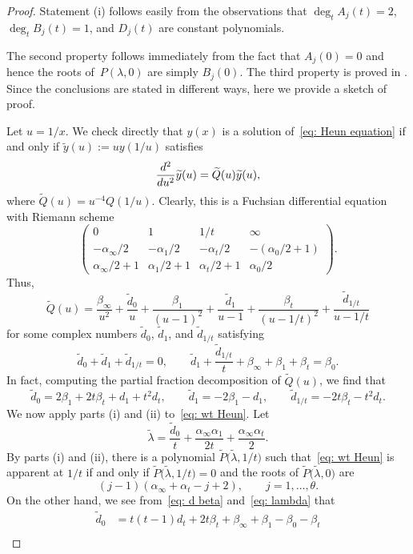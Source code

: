 \documentclass[11pt]{article}
\numberwithin{equation}{section}
\numberwithin{equation}{section}
\def\wt#1{\widetilde{#1}}
\begin{document}
\begin{proof}
Statement (i) follows easily from the observations that
 $\deg_t A_j(t)=2$, ${\deg_tB_j(t)=1}$, and $D_j(t)$ are
 constant polynomials.

 The second property follows immediately from the fact that
 $A_j(0)=0$ and hence the roots of~$P(\lambda,0)$ are simply
 $B_j(0)$. The third property is proved in \cite[Theorem~B.3]{Chen-Lin-Yang}. Since the conclusions are stated in different
 ways, here we provide a sketch of proof.

 Let $u=1/x$. We check directly that $y(x)$ is a solution of~\eqref{eq: Heun equation} if and only if $\wt y(u):=uy(1/u)$
 satisfies
 \begin{equation} \label{eq: wt Heun}
 \frac{{\rm d}^2}{{\rm d}u^2}\wt y(u)=\wt Q(u)\wt y(u),
 \end{equation}
 where $\wt Q(u)=u^{-4}Q(1/u)$. Clearly, this is a Fuchsian
 differential equation with Riemann scheme
\[
 \begin{pmatrix}
 0 & 1 & 1/t & \infty \\
 -\alpha_\infty/2 & -\alpha_1/2 & -\alpha_t/2 &
 -(\alpha_0/2+1) \\
 \alpha_\infty/2+1 & \alpha_1/2+1 & \alpha_t/2+1
 & \alpha_0/2 \end{pmatrix}.
\]
 Thus,
\[
 \wt Q(u)=\frac{\beta_\infty}{u^2}+\frac{\wt d_0}u
 +\frac{\beta_1}{(u-1)^2}+\frac{\wt d_1}{u-1}
 +\frac{\beta_t}{(u-1/t)^2}+\frac{\wt d_{1/t}}{u-1/t}
\]
 for some complex numbers $\wt d_0$, $\wt d_1$, and $\wt d_{1/t}$
 satisfying
\[
 \wt d_0+\wt d_1+\wt d_{1/t}=0, \qquad
 \wt d_1+\frac{\wt d_{1/t}}t+\beta_\infty+\beta_1+\beta_t=\beta_0.
\]
In fact, computing the partial fraction decomposition of $\wt Q(u)$,
 we find that
\[
 \wt d_0=2\beta_1+2t\beta_t+d_1+t^2d_t, \qquad
 \wt d_1=-2\beta_1-d_1, \qquad
 \wt d_{1/t}=-2t\beta_t-t^2d_t.
\]
 We now apply parts (i) and (ii) to~\eqref{eq: wt Heun}. Let
\[
 \wt\lambda=\frac{\wt d_0}t+\frac{\alpha_\infty\alpha_1}{2t}
 +\frac{\alpha_\infty\alpha_t}2.
\]
 By parts (i) and (ii), there is a polynomial $\wt P\bigl(\wt\lambda,1/t\bigr)$
 such that~\eqref{eq: wt Heun} is apparent at $1/t$ if and only if
 $\wt P\bigl(\wt\lambda,1/t\bigr)=0$ and the roots of $\wt P\bigl(\wt\lambda,0\bigr)$
 are
\[
 (j-1)(\alpha_\infty+\alpha_t-j+2), \qquad
 j=1,\dots,\theta.
\]
 On the other hand, we see from~\eqref{eq: d beta} and~\eqref{eq: lambda} that
 \begin{align*}\wt d_0
 &{}=t(t-1)d_t+2t\beta_t+\beta_\infty+\beta_1-\beta_0-\beta_t\\

\end{align*}
\end{proof}
\end{document}
